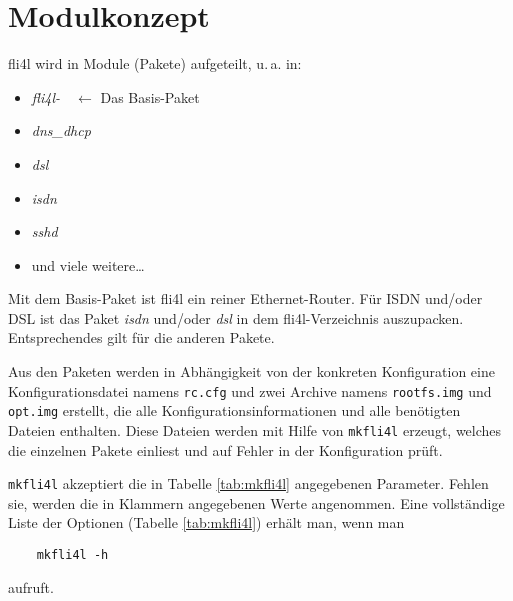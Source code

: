 
\section{Modulkonzept}

fli4l wird in Module (Pakete) aufgeteilt, u.\,a. in:
\begin{itemize}
    \item \emph{fli4l-\version}~~\(\longleftarrow\) Das Basis-Paket
    \item \emph{dns\_dhcp}
    \item \emph{dsl}
    \item \emph{isdn}
    \item \emph{sshd}
    \item und viele weitere\ldots
\end{itemize}

Mit dem Basis-Paket ist fli4l ein reiner Ethernet-Router. Für ISDN
und/oder DSL ist das Paket \emph{isdn} und/oder \emph{dsl} in dem
fli4l-Verzeichnis auszupacken. Entsprechendes gilt für die anderen Pakete.


Aus den Paketen werden in Abhängigkeit von der konkreten Konfiguration
eine Konfigurationsdatei namens \texttt{rc.cfg} und zwei Archive namens
\texttt{rootfs.img} und \texttt{opt.img} erstellt, die alle
Konfigurationsinformationen und alle benötigten Dateien enthalten. Diese Dateien
werden mit Hilfe von \texttt{mkfli4l} erzeugt, welches die einzelnen Pakete
einliest und auf Fehler in der Konfiguration prüft.

\texttt{mkfli4l} akzeptiert die in Tabelle \ref{tab:mkfli4l} angegebenen
Parameter. Fehlen sie, werden die in Klammern angegebenen Werte angenommen.
Eine vollständige Liste der Optionen (Tabelle \ref{tab:mkfli4l}) erhält man,
wenn man
\begin{verbatim}
    mkfli4l -h
\end{verbatim}
aufruft.

